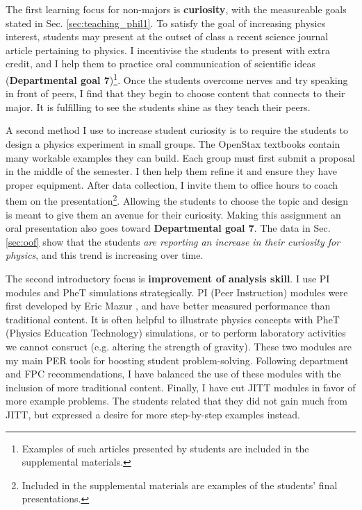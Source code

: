 \documentclass[../../../main.tex]{subfiles}
\begin{document}
The first learning focus for non-majors is \textbf{curiosity}, with the measureable goals stated in Sec. \ref{sec:teaching_phil1}.  To satisfy the goal of increasing physics interest, students may present at the outset of class a recent science journal article pertaining to physics.  I incentivise the students to present with extra credit, and I help them to practice oral communication of scientific ideas (\textbf{Departmental goal 7})\footnote{Examples of such articles presented by students are included in the supplemental materials.}.  Once the students overcome nerves and try speaking in front of peers, I find that they begin to choose content that connects to their major.  It is fulfilling to see the students shine as they teach their peers.  \\ \hspace{0.1cm}

A second method I use to increase student curiosity is to require the students to design a physics experiment in small groups.  The OpenStax textbooks contain many workable examples they can build.  Each group must first submit a proposal in the middle of the semester.  I then help them refine it and ensure they have proper equipment.  After data collection, I invite them to office hours to coach them on the presentation\footnote{Included in the supplemental materials are examples of the students' final presentations.}.  Allowing the students to choose the topic and design is meant to give them an avenue for their curiosity.  Making this assignment an oral presentation also goes toward \textbf{Departmental goal 7}.  The data in Sec. \ref{sec:oof} show that the students \textit{are reporting an increase in their curiosity for physics}, and this trend is increasing over time. \\ \hspace{0.1cm}

The second introductory focus is \textbf{improvement of analysis skill}.  I use PI modules and PheT simulations strategically.  PI (Peer Instruction) modules were first developed by Eric Mazur \cite{mazur2013peer}, and have better measured performance than traditional content.  It is often helpful to illustrate physics concepts with PheT (Physics Education Technology) simulations, or to perform laboratory activities we cannot consruct (e.g. altering the strength of gravity)\cite{phet}.  These two modules are my main PER tools for boosting student problem-solving.  Following department and FPC recommendations, I have balanced the use of these modules with the inclusion of more traditional content.  Finally, I have cut JITT modules \cite{jitt} in favor of more example problems.  The students related that they did not gain much from JITT, but expressed a desire for more step-by-step examples instead.  \\ \hspace{0.1cm}
\end{document}
